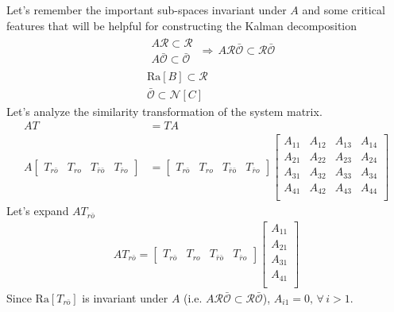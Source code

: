 \documentclass[twoside]{article}
\begin{document}
%
Let's remember the important sub-spaces invariant under $A$ and some critical features that will be helpful 
for constructing the Kalman decomposition
\begin{align*}
    &\begin{array}{c} A \mathcal{R} \subset \mathcal{R}
    \\
    A \bar{\mathcal{O}} \subset \bar{\mathcal{O}} \end{array} \, \Rightarrow \, A \mathcal{R}\bar{\mathcal{O}} \subset \mathcal{R}\bar{\mathcal{O}}
    \\
    &\mathrm{Ra}[B] \subset \mathcal{R}
    \\
    &\bar{\mathcal{O}} \subset \mathcal{N}[C]
\end{align*}
%
Let's analyze the similarity transformation of the system matrix.
%
\begin{align*}
    A T &=  T A
    \\
    A \left[ \begin{array}{c|c|c|c} T_{r\bar{o}} & T_{ro} & T_{\bar{r} \bar{o}} & T_{\bar{r} o} \end{array} \right]
    &= \left[ \begin{array}{c|c|c|c} T_{r\bar{o}} & T_{ro} & T_{\bar{r} \bar{o}} & T_{\bar{r} o} \end{array} \right]
    \left[ \begin{array}{c|c|c|c} A_{11} & A_{12} & A_{13} & A_{14} \\ \hline 
    A_{21} & A_{22} & A_{23} & A_{24} \\ \hline 
    A_{31} & A_{32} & A_{33} & A_{34} \\ \hline 
    A_{41} & A_{42} & A_{43} & A_{44} \\ 
    \end{array} \right]
\end{align*}
%
Let's expand $A T_{r\bar{o}}$
%
\begin{align*}
    A T_{r\bar{o}} = \left[ \begin{array}{c|c|c|c} T_{r\bar{o}} & T_{ro} & T_{\bar{r} \bar{o}} & T_{\bar{r} o} \end{array} \right]
    \left[ \begin{array}{c} A_{11} \\ \hline 
    A_{21} \\ \hline 
    A_{31} \\ \hline 
    A_{41} \\ 
    \end{array} \right]
\end{align*}
%
Since $\mathrm{Ra}[ T_{r\bar{o}} ]$ is invariant under $A$ (i.e. $A \mathcal{R}\bar{\mathcal{O}} \subset \mathcal{R}\bar{\mathcal{O}}$), 
$A_{i1} = 0 , \, \forall \, i>1$. 
\end{document}
